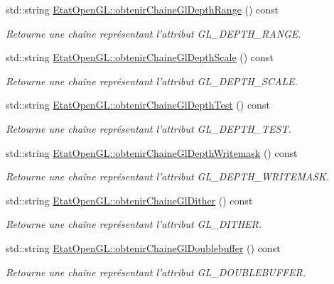 \begin{DoxyCompactItemize}
std\-::string \hyperlink{group__utilitaire_ga9921b541644f4dc3b64a4ffd4a661a09}{Etat\-Open\-G\-L\-::obtenir\-Chaine\-Gl\-Depth\-Range} () const 
\begin{DoxyCompactList}\small\item\em Retourne une chaîne représentant l'attribut G\-L\-\_\-\-D\-E\-P\-T\-H\-\_\-\-R\-A\-N\-G\-E. \end{DoxyCompactList}\item 
std\-::string \hyperlink{group__utilitaire_ga4fac162003ef8c012c16ecd9041794ae}{Etat\-Open\-G\-L\-::obtenir\-Chaine\-Gl\-Depth\-Scale} () const 
\begin{DoxyCompactList}\small\item\em Retourne une chaîne représentant l'attribut G\-L\-\_\-\-D\-E\-P\-T\-H\-\_\-\-S\-C\-A\-L\-E. \end{DoxyCompactList}\item 
std\-::string \hyperlink{group__utilitaire_ga712bcce1fd6c63377d2b3c9c421f7559}{Etat\-Open\-G\-L\-::obtenir\-Chaine\-Gl\-Depth\-Test} () const 
\begin{DoxyCompactList}\small\item\em Retourne une chaîne représentant l'attribut G\-L\-\_\-\-D\-E\-P\-T\-H\-\_\-\-T\-E\-S\-T. \end{DoxyCompactList}\item 
std\-::string \hyperlink{group__utilitaire_gaec88db9c85bfd66909d3172982025862}{Etat\-Open\-G\-L\-::obtenir\-Chaine\-Gl\-Depth\-Writemask} () const 
\begin{DoxyCompactList}\small\item\em Retourne une chaîne représentant l'attribut G\-L\-\_\-\-D\-E\-P\-T\-H\-\_\-\-W\-R\-I\-T\-E\-M\-A\-S\-K. \end{DoxyCompactList}\item 
std\-::string \hyperlink{group__utilitaire_gabc6e75dad01908ff21a473d75483f691}{Etat\-Open\-G\-L\-::obtenir\-Chaine\-Gl\-Dither} () const 
\begin{DoxyCompactList}\small\item\em Retourne une chaîne représentant l'attribut G\-L\-\_\-\-D\-I\-T\-H\-E\-R. \end{DoxyCompactList}\item 
std\-::string \hyperlink{group__utilitaire_gae8239c45bba646389f06a6bdd49670f3}{Etat\-Open\-G\-L\-::obtenir\-Chaine\-Gl\-Doublebuffer} () const 
\begin{DoxyCompactList}\small\item\em Retourne une chaîne représentant l'attribut G\-L\-\_\-\-D\-O\-U\-B\-L\-E\-B\-U\-F\-F\-E\-R. \end{DoxyCompactList}\item 

\end{DoxyCompactItemize}
